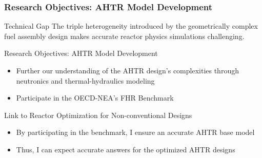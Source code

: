 \begin{frame}
  \frametitle{Research Objectives: AHTR Model Development}
  \begin{block}{Technical Gap}
      The triple heterogeneity introduced by the geometrically complex 
      fuel assembly design makes accurate reactor physics simulations challenging. 
  \end{block}
  \begin{block}{Research Objectives: AHTR Model Development}
    \begin{itemize}
      \item Further our understanding of the AHTR design's complexities 
      through neutronics and thermal-hydraulics modeling
      \item Participate in the OECD-NEA's FHR Benchmark 
    \end{itemize}
  \end{block}
  \begin{block}{Link to Reactor Optimization for Non-conventional Designs}
  \begin{itemize}
    \item By participating in the benchmark, I ensure an accurate AHTR base model
    \item Thus, I can expect accurate answers for the optimized AHTR designs
  \end{itemize}
  \end{block}
\end{frame}